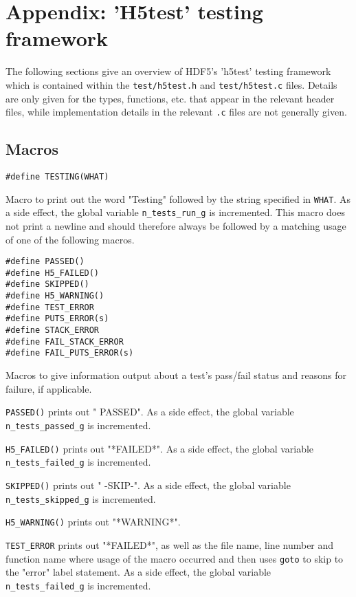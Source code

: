 \documentclass[../HDF5_RFC.tex]{subfiles}
\begin{document}
\newpage

\section{Appendix: 'H5test' testing framework}
\label{apdx:h5test}

The following sections give an overview of HDF5's 'h5test' testing framework which is contained
within the \texttt{test/h5test.h} and \texttt{test/h5test.c} files. Details are only given for the
types, functions, etc. that appear in the relevant header files, while implementation details
in the relevant \texttt{.c} files are not generally given.

\subsection{Macros}

\begin{verbatim}
#define TESTING(WHAT)
\end{verbatim}

Macro to print out the word "Testing" followed by the string specified in \texttt{WHAT}. As a side
effect, the global variable \texttt{n\_tests\_run\_g} is incremented. This macro does not print a
newline and should therefore always be followed by a matching usage of one of the following macros.

\begin{verbatim}
#define PASSED()
#define H5_FAILED()
#define SKIPPED()
#define H5_WARNING()
#define TEST_ERROR
#define PUTS_ERROR(s)
#define STACK_ERROR
#define FAIL_STACK_ERROR
#define FAIL_PUTS_ERROR(s)
\end{verbatim}

Macros to give information output about a test's pass/fail status and reasons for failure, if
applicable.

\texttt{PASSED()} prints out " PASSED". As a side effect, the global variable
\texttt{n\_tests\_passed\_g} is incremented.

\texttt{H5\_FAILED()} prints out "*FAILED*". As a side effect, the global variable
\texttt{n\_tests\_failed\_g} is incremented.

\texttt{SKIPPED()} prints out " -SKIP-". As a side effect, the global variable
\texttt{n\_tests\_skipped\_g} is incremented.

\texttt{H5\_WARNING()} prints out "*WARNING*".

\texttt{TEST\_ERROR} prints out "*FAILED*", as well as the file name, line number and function name
where usage of the macro occurred and then uses \texttt{goto} to skip to the "error" label statement.
As a side effect, the global variable \texttt{n\_tests\_failed\_g} is incremented.
\end{document}
